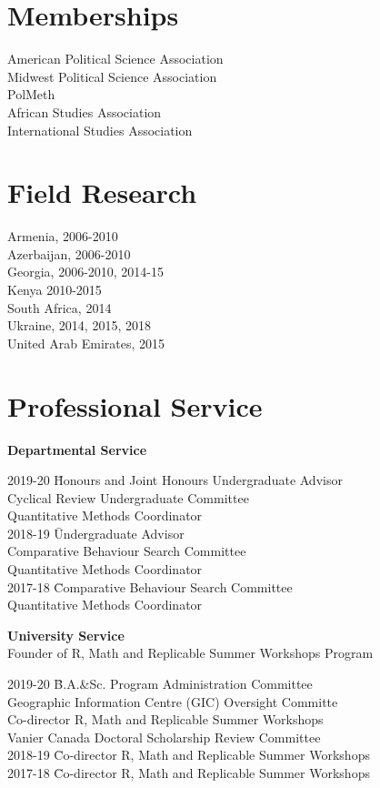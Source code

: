 \documentclass[margin,line]{res}
\begin{document}
{\begin{resume}
\section{\sc Memberships}
American Political Science Association \\
Midwest Political Science Association\\
PolMeth\\
African Studies Association\\
International Studies Association

\section{\sc Field Research}
Armenia, 2006-2010  \\
Azerbaijan, 2006-2010\\
Georgia, 2006-2010, 2014-15 \\
Kenya 2010-2015 \\
South Africa, 2014 \\
Ukraine, 2014, 2015, 2018 \\
United Arab Emirates, 2015 \\


\section{\sc  Professional Service}
\textbf{Departmental Service}\\
\vspace{-3em}
\begin{tabbing}
2019-20    \=  Honours and Joint Honours Undergraduate Advisor\\
 \> Cyclical Review Undergraduate Committee \\
\> Quantitative Methods Coordinator \\

2018-19    \=  Undergraduate Advisor\\
\> Comparative Behaviour Search Committee\\
\> Quantitative Methods Coordinator \\
2017-18    \=  Comparative Behaviour Search Committee\\
\> Quantitative Methods Coordinator
\end{tabbing}

\textbf{University Service}\\
Founder of R, Math and Replicable Summer Workshops Program

\begin{tabbing}
2019-20 \= B.A.\&Sc. Program Administration Committee \\
\> Geographic Information Centre (GIC) Oversight Committe \\
\> Co-director  R, Math and Replicable Summer Workshops \\
\> Vanier Canada Doctoral Scholarship Review Committee \\
2018-19 \=  Co-director  R, Math and Replicable Summer Workshops\\
2017-18 \=  Co-director  R, Math and Replicable Summer Workshops
\end{tabbing}



\end{resume}}
\end{document}
